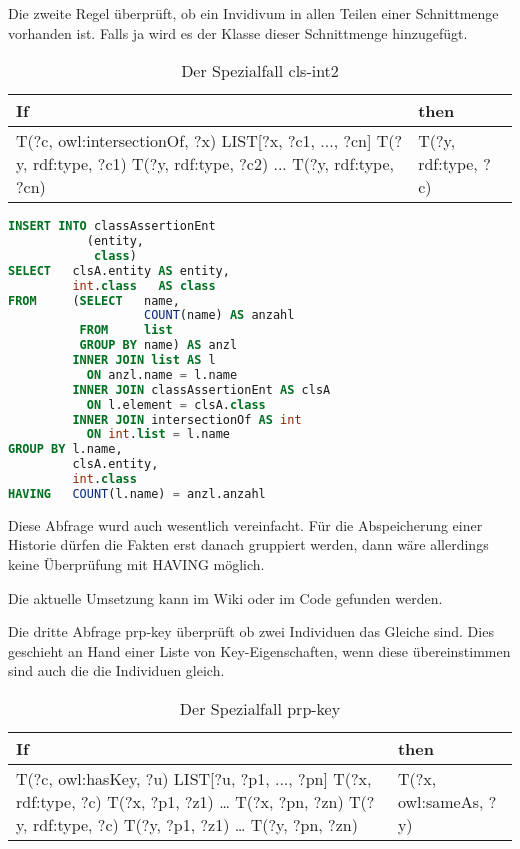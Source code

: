 Die zweite Regel überprüft, ob ein Invidivum in allen Teilen einer Schnittmenge vorhanden ist. Falls ja wird es der Klasse dieser Schnittmenge hinzugefügt.
\begin{table}
\begin{tabular}{l|l}
If & then \\ \hline
T(?c, owl:intersectionOf, ?x)
LIST[?x, ?c1, ..., ?cn]
T(?y, rdf:type, ?c1)
T(?y, rdf:type, ?c2)
...
T(?y, rdf:type, ?cn) & T(?y, rdf:type, ?c) 	 
\end{tabular}
\caption{Der Spezialfall cls-int2}
\label{rule-cls-int2}
\end{table}


\begin{lstlisting}[language=SQL]
INSERT INTO classAssertionEnt
           (entity,
            class)
SELECT   clsA.entity AS entity,
         int.class   AS class
FROM     (SELECT   name,
                   COUNT(name) AS anzahl
          FROM     list
          GROUP BY name) AS anzl
         INNER JOIN list AS l
           ON anzl.name = l.name
         INNER JOIN classAssertionEnt AS clsA
           ON l.element = clsA.class
         INNER JOIN intersectionOf AS int
           ON int.list = l.name
GROUP BY l.name,
         clsA.entity,
         int.class
HAVING   COUNT(l.name) = anzl.anzahl
\end{lstlisting}

Diese Abfrage wurd auch wesentlich vereinfacht. Für die Abspeicherung einer Historie dürfen die Fakten erst danach gruppiert werden, dann wäre allerdings keine Überprüfung mit HAVING möglich.

Die aktuelle Umsetzung kann im Wiki oder im Code gefunden werden.

Die dritte Abfrage prp-key überprüft ob zwei Individuen das Gleiche sind. Dies geschieht an Hand einer Liste  von Key-Eigenschaften, wenn diese übereinstimmen sind auch die die Individuen gleich.
\begin{table}
\begin{tabular}{l|l}
If & then \\ \hline
T(?c, owl:hasKey, ?u)
LIST[?u, ?p1, ..., ?pn]
T(?x, rdf:type, ?c)
T(?x, ?p1, ?z1)
\ldots
T(?x, ?pn, ?zn)
T(?y, rdf:type, ?c)
T(?y, ?p1, ?z1)
\ldots
T(?y, ?pn, ?zn) & T(?x, owl:sameAs, ?y)
\end{tabular}
\caption{Der Spezialfall prp-key}
\label{rule-prp-key}
\end{table}


